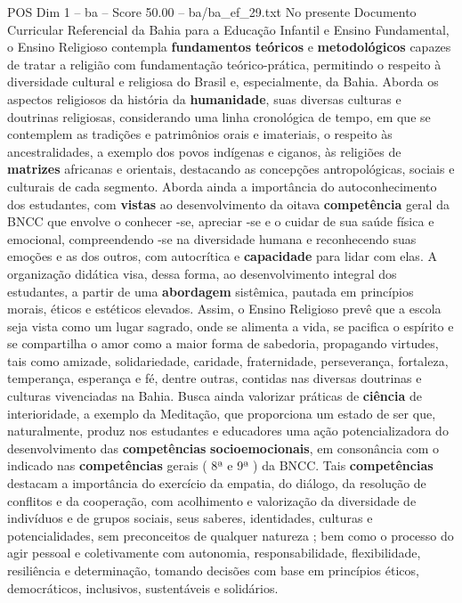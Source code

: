 \begin{textsample}{POS Dim 1 – ba – Score 50.00 – ba/ba\_ef\_29.txt}
No presente Documento Curricular Referencial da Bahia para a Educação Infantil e Ensino Fundamental, o Ensino Religioso contempla \textbf{fundamentos} \textbf{teóricos} e \textbf{metodológicos} capazes de tratar a religião com fundamentação teórico-prática, permitindo o respeito à diversidade cultural e religiosa do Brasil e, especialmente, da Bahia.
Aborda os aspectos religiosos da história da \textbf{humanidade}, suas diversas culturas e doutrinas religiosas, considerando uma linha cronológica de tempo, em que se contemplem as tradições e patrimônios orais e imateriais, o respeito às ancestralidades, a exemplo dos povos indígenas e ciganos, às religiões de \textbf{matrizes} africanas e orientais, destacando as concepções antropológicas, sociais e culturais de cada segmento.
Aborda ainda a importância do autoconhecimento dos estudantes, com \textbf{vistas} ao desenvolvimento da oitava \textbf{competência} geral da BNCC que envolve o conhecer -se, apreciar -se e o cuidar de sua saúde física e emocional, compreendendo -se na diversidade humana e reconhecendo suas emoções e as dos outros, com autocrítica e \textbf{capacidade} para lidar com elas.
A organização didática visa, dessa forma, ao desenvolvimento integral dos estudantes, a partir de uma \textbf{abordagem} sistêmica, pautada em princípios morais, éticos e estéticos elevados.
Assim, o Ensino Religioso prevê que a escola seja vista como um lugar sagrado, onde se alimenta a vida, se pacifica o espírito e se compartilha o amor como a maior forma de sabedoria, propagando virtudes, tais como amizade, solidariedade, caridade, fraternidade, perseverança, fortaleza, temperança, esperança e fé, dentre outras, contidas nas diversas doutrinas e culturas vivenciadas na Bahia.
Busca ainda valorizar práticas de \textbf{ciência} de interioridade, a exemplo da Meditação, que proporciona um estado de ser que, naturalmente, produz nos estudantes e educadores uma ação potencializadora do desenvolvimento das \textbf{competências} \textbf{socioemocionais}, em consonância com o indicado nas \textbf{competências} gerais ( 8ª e 9ª ) da BNCC.
Tais \textbf{competências} destacam a importância do exercício da empatia, do diálogo, da resolução de conflitos e da cooperação, com acolhimento e valorização da diversidade de indivíduos e de grupos sociais, seus saberes, identidades, culturas e potencialidades, sem preconceitos de qualquer natureza ; bem como o processo do agir pessoal e coletivamente com autonomia, responsabilidade, flexibilidade, resiliência e determinação, tomando decisões com base em princípios éticos, democráticos, inclusivos, sustentáveis e solidários.

\end{textsample}
